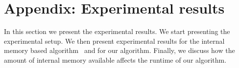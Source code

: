 \vspace{-2mm}
\enlargethispage{2\baselineskip}
\section{Appendix: Experimental results}
\label{sec:experimental-results}
\vspace{-1mm}

In this section we present the experimental results.
We start presenting the experimental setup. 
We then present experimental results for
the internal memory based algorithm~\cite{bkz05} 
and for our algorithm.
Finally, we discuss how the amount of internal memory available 
affects the runtime of our algorithm. 
